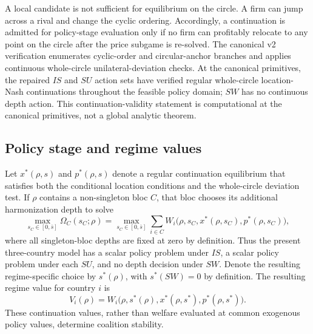 A local candidate is not sufficient for equilibrium on the circle. A firm can jump across a rival and change the cyclic ordering. Accordingly, a continuation is admitted for policy-stage evaluation only if no firm can profitably relocate to any point on the circle after the price subgame is re-solved. The canonical v2 verification enumerates cyclic-order and circular-anchor branches and applies continuous whole-circle unilateral-deviation checks. At the canonical primitives, the repaired $IS$ and $SU$ action sets have verified regular whole-circle location-Nash continuations throughout the feasible policy domain; $SW$ has no continuous depth action. This continuation-validity statement is computational at the canonical primitives, not a global analytic theorem.

\subsection{Policy stage and regime values}

Let $x^*(\rho,s)$ and $p^*(\rho,s)$ denote a regular continuation equilibrium that satisfies both the conditional location conditions and the whole-circle deviation test. If $\rho$ contains a non-singleton bloc $C$, that bloc chooses its additional harmonization depth to solve
\[
\max_{s_C\in[0,\bar s]}
\Omega_C(s_C;\rho)
=
\max_{s_C\in[0,\bar s]}
\sum_{i\in C}W_i\bigl(\rho,s_C,x^*(\rho,s_C),p^*(\rho,s_C)\bigr),
\]
where all singleton-bloc depths are fixed at zero by definition. Thus the present three-country model has a scalar policy problem under $IS$, a scalar policy problem under each $SU$, and no depth decision under $SW$. Denote the resulting regime-specific choice by $s^*(\rho)$, with $s^*(SW)=0$ by definition. The resulting regime value for country $i$ is
\begin{equation}\label{eq:regime-value}
V_i(\rho)=W_i\bigl(\rho,s^*(\rho),x^*(\rho,s^*),p^*(\rho,s^*)\bigr).
\end{equation}
These continuation values, rather than welfare evaluated at common exogenous policy values, determine coalition stability.